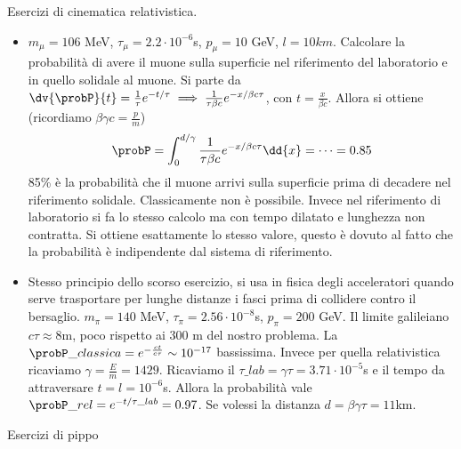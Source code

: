 
Esercizi di cinematica relativistica.
\begin{itemize}
    \item $m_\mu=106$ MeV, $\tau_\mu=2.2\cdot10^{-6}$s, $p_\mu=10$ GeV, $l=10km$. Calcolare la probabilità di avere il muone sulla superficie nel riferimento del laboratorio e in quello solidale al muone. Si parte da $\dv{\probP}{t}=\frac1\tau e^{-t/\tau}\implies \frac1{\tau\beta c}e^{-x/\beta c\tau}$, con $t=\frac x{\beta c}$. Allora si ottiene  (ricordiamo $\beta\gamma c=\frac p m$)
    \begin{equation*}
    \probP=\int_0^{d/\gamma}\frac1{\tau\beta c}e^{-x/\beta c \tau}\dd{x}=\dots =0.85
    \end{equation*}
    85\% è la probabilità che il muone arrivi sulla superficie prima di decadere nel riferimento solidale. Classicamente non è possibile. Invece nel riferimento di laboratorio si fa lo stesso calcolo ma con tempo dilatato e lunghezza non contratta. Si ottiene esattamente lo stesso valore, questo è dovuto al fatto che la probabilità è indipendente dal sistema di riferimento.
    \item Stesso principio dello scorso esercizio, si usa in fisica degli acceleratori quando serve trasportare per lunghe distanze i fasci prima di collidere contro il bersaglio. $m_\pi=140$ MeV, $\tau_\pi=2.56\cdot10^{-8}$s, $p_\pi=200$ GeV. Il limite galileiano $c\tau\approx 8$m, poco rispetto ai 300 m del nostro problema. La $\probP\_{classica}=e^{-\frac{ct}{c\tau}}\sim 10^{-17}$ bassissima. Invece per quella relativistica ricaviamo $\gamma=\frac E {m}=1429$. Ricaviamo il $\tau\_{lab}=\gamma \tau =3.71\cdot 10^{-5}$s e il tempo da attraversare $t=l=10^{-6}$s. Allora la probabilità vale $\probP\_{rel}=e^{-t/\tau\_{lab}}=0.97$. Se volessi la distanza $d=\beta \gamma \tau=11$km.
\end{itemize}
Esercizi di pippo